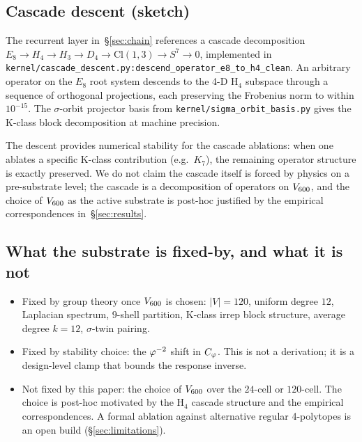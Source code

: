 \subsection{Cascade descent (sketch)}\label{ssec:cascade}

The recurrent layer in~\S\ref{sec:chain} references a cascade
decomposition $E_{8}\to H_{4}\to H_{3}\to D_{4}\to \mathrm{Cl}(1,3)
\to S^{7}\to 0$, implemented in
\texttt{kernel/cascade\_descent.py:descend\_operator\_e8\_to\_h4\_clean}.
An arbitrary operator on the $E_{8}$ root system descends to the
4-D H$_4$ subspace through a sequence of orthogonal projections, each
preserving the Frobenius norm to within $10^{-15}$. The
$\sigma$-orbit projector basis from
\texttt{kernel/sigma\_orbit\_basis.py} gives the K-class block
decomposition at machine precision.

The descent provides numerical stability for the cascade ablations:
when one ablates a specific K-class contribution (e.g.\ $K_{7}$), the
remaining operator structure is exactly preserved. We do not claim
the cascade itself is forced by physics on a pre-substrate level; the
cascade is a decomposition of operators on $V_{600}$, and the
choice of $V_{600}$ as the active substrate is post-hoc justified
by the empirical correspondences in~\S\ref{sec:results}.

\subsection{What the substrate is fixed-by, and what it is not}

\begin{itemize}\itemsep=2pt
\item Fixed by group theory once $V_{600}$ is chosen: $|V|=120$,
  uniform degree $12$, Laplacian spectrum, $9$-shell partition, K-class
  irrep block structure, average degree $k\!=\!12$, $\sigma$-twin pairing.
\item Fixed by stability choice: the $\varphi^{-2}$ shift in $C_{\varphi}$. This
  is not a derivation; it is a design-level clamp that bounds the
  response inverse.
\item Not fixed by this paper: the choice of $V_{600}$ over the
  $24$-cell or $120$-cell. The choice is post-hoc motivated by the H$_4$
  cascade structure and the empirical correspondences. A formal
  ablation against alternative regular 4-polytopes is an open build
  (\S\ref{sec:limitations}).
\end{itemize}
